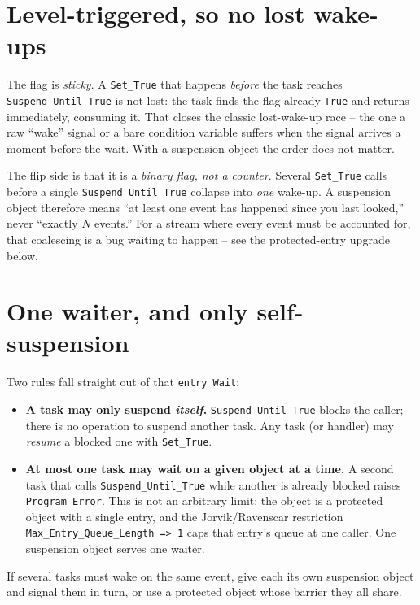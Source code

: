 \section{Level-triggered, so no lost wake-ups}

The flag is \emph{sticky}. A \texttt{Set\_True} that happens \emph{before} the task
reaches \texttt{Suspend\_Until\_True} is not lost: the task finds the flag already
\texttt{True} and returns immediately, consuming it. That closes the classic
lost-wake-up race -- the one a raw ``wake'' signal or a bare condition variable
suffers when the signal arrives a moment before the wait. With a suspension object
the order does not matter.

The flip side is that it is a \emph{binary flag, not a counter}. Several
\texttt{Set\_True} calls before a single \texttt{Suspend\_Until\_True} collapse into
\emph{one} wake-up. A suspension object therefore means ``at least one event has
happened since you last looked,'' never ``exactly $N$ events.'' For a stream where
every event must be accounted for, that coalescing is a bug waiting to happen -- see
the protected-entry upgrade below.

\section{One waiter, and only self-suspension}

Two rules fall straight out of that \texttt{entry Wait}:

\begin{itemize}
\item \textbf{A task may only suspend \emph{itself}.} \texttt{Suspend\_Until\_True}
  blocks the caller; there is no operation to suspend another task. Any task (or
  handler) may \emph{resume} a blocked one with \texttt{Set\_True}.
\item \textbf{At most one task may wait on a given object at a time.} A second task
  that calls \texttt{Suspend\_Until\_True} while another is already blocked raises
  \texttt{Program\_Error}. This is not an arbitrary limit: the object is a protected
  object with a single entry, and the Jorvik/Ravenscar restriction
  \texttt{Max\_Entry\_Queue\_Length =>\ 1} caps that entry's queue at one caller.
  One suspension object serves one waiter.
\end{itemize}

If several tasks must wake on the same event, give each its own suspension object
and signal them in turn, or use a protected object whose barrier they all share.

